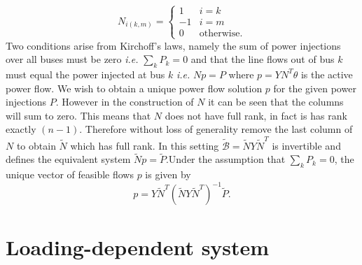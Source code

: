 \documentclass{article}
\newcommand{\ie}{\textit{i.e. }}
\begin{document}
\begin{equation}
N_{i(k,m)} = \begin{cases}
1 & i=k\\
-1 & i=m\\
0 & \text{otherwise}.
\end{cases}
\end{equation}
Two conditions arise from Kirchoff's laws, namely the sum of power injections over all buses must be zero \ie $\sum_{k}P_k=0$ and that the line flows out of bus $k$ must equal the power injected at bus $k$ \ie $Np=P$ where $p=YN^T\theta$ is the active power flow. We wish to obtain a unique power flow solution $p$ for the given power injections $P$. However in the construction of $N$ it can be seen that the columns will sum to zero. This means that $N$ does not have full rank, in fact is has rank exactly $(n-1)$. Therefore without loss of generality remove the last column of $N$ to obtain $\tilde N$ which has full rank. In this setting $\tilde{\mathcal{B}}=\tilde N Y \tilde N^T$ is invertible and defines the equivalent system $\tilde N p = \tilde P$.Under the assumption that $\sum_{k}P_k=0$, the unique vector of feasible flows $p$ is given by
\begin{equation}
p = Y\tilde N^T(\tilde N Y \tilde N^T)^{-1}\tilde P.
\end{equation}

\section{Loading-dependent system}
\end{document}
